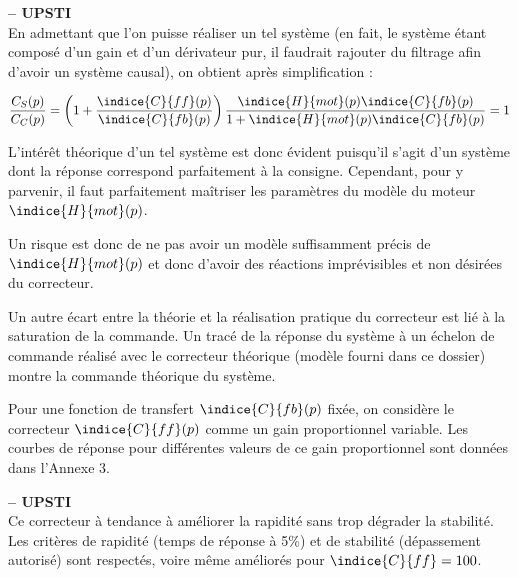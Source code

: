 \ifprof
\begin{corrige}\textbf{ -- UPSTI}\\ 
En admettant que l’on puisse réaliser un tel système (en fait, le système étant composé d’un gain et d’un dérivateur pur, il faudrait rajouter du filtrage afin d’avoir un système causal), on obtient après simplification :
 
$\dfrac{C_S (p)}{C_C (p)}=\left(
1+\dfrac{\indice{C}{ff} (p)}{\indice{C}{fb} (p)}\right)
\dfrac{\indice{H}{mot}(p) \indice{C}{fb}(p)}{1+\indice{H}{mot}(p) \indice{C}{fb}(p)}=1$


L’intérêt théorique d’un tel système est donc évident puisqu’il s’agit d’un système dont la réponse correspond parfaitement à la consigne.
Cependant, pour y parvenir, il faut parfaitement maîtriser les paramètres du modèle du moteur $\indice{H}{mot} (p)$.

Un risque est donc de ne pas avoir un modèle suffisamment précis de $\indice{H}{mot} (p)$ et donc d’avoir des réactions imprévisibles et non désirées du correcteur.

Un autre  écart entre la théorie et la réalisation pratique du correcteur  est lié à la saturation de la commande. Un tracé de la réponse du système à un échelon de commande réalisé avec le correcteur théorique (modèle fourni dans ce dossier) montre la commande théorique du système.

\end{corrige}
\else
\fi

Pour une fonction de transfert $\indice{C}{fb} (p)$ fixée, on considère le correcteur $\indice{C}{ff}(p)$ comme un gain
proportionnel variable. Les courbes de réponse pour différentes valeurs de ce gain proportionnel
sont données dans l'Annexe 3.

\ifprof
\begin{corrige}\textbf{ -- UPSTI}\\ 
Ce correcteur à tendance à améliorer la rapidité sans trop dégrader la stabilité. Les critères de rapidité (temps de réponse à 5\%) et de stabilité (dépassement autorisé) sont respectés, voire même améliorés pour $\indice{C}{ff}  = 100$.
\end{corrige}
\else
\fi

